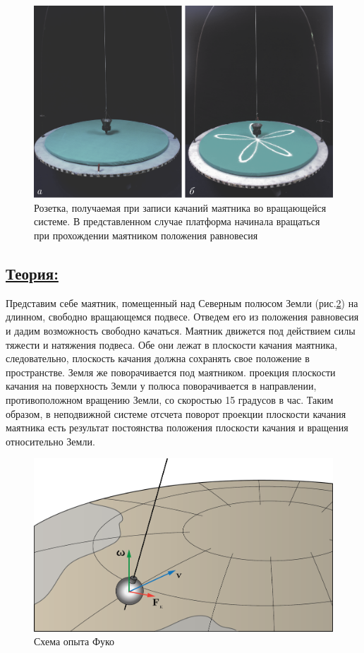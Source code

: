 \documentclass[14pt,a4paper,oneside]{extarticle}	%
\begin{document}
\begin{figure}[H] 	
	\centering 	
	\includegraphics[width=0.8\linewidth]{fuko-3.png}
	\caption{Розетка, получаемая при записи качаний маятника во вращающейся системе. В представленном случае платформа начинала вращаться при прохождении маятником положения равновесия}
	\label{fuko-3}
\end{figure}

	
\newpage
	\subsection*{\underline{Теория:}}
	
	Представим себе маятник, помещенный над Северным полюсом Земли (рис.\ref{fuko-4}) на длинном, свободно вращающемся подвесе.
	Отведем его из положения равновесия и дадим возможность свободно качаться.
	Маятник движется под действием силы тяжести и натяжения подвеса.
	Обе они лежат в плоскости качания маятника, следовательно, плоскость качания должна сохранять свое положение в пространстве.
	Земля же поворачивается под маятником.
	проекция плоскости качания на поверхность Земли у полюса поворачивается в направлении, противоположном вращению Земли, со скоростью 15 градусов в час.
	Таким образом, в неподвижной системе отсчета поворот проекции плоскости качания маятника есть результат постоянства положения плоскости качания и вращения относительно Земли.
	
	\begin{figure}[H] 	
		\centering 	
		\includegraphics[width=0.75\linewidth]{fuko-4.png}
		\caption{Схема опыта Фуко}
		\label{fuko-4}
	\end{figure}
		
\end{document}
